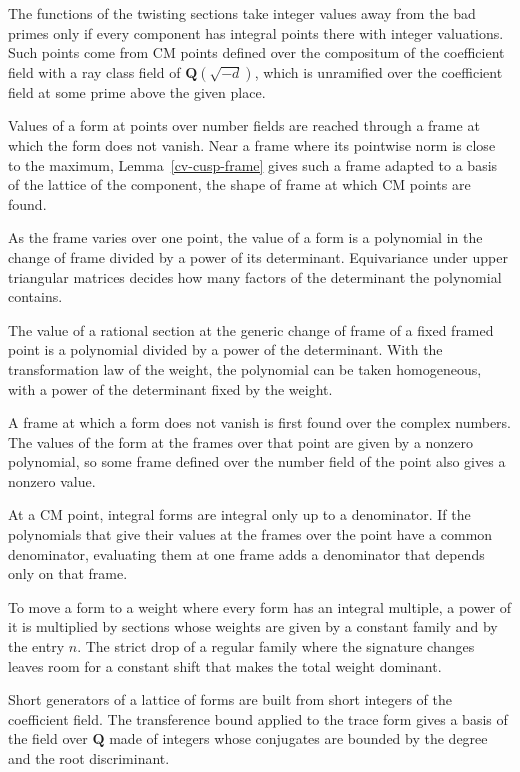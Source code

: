 The functions of the twisting sections take integer values away from the bad primes only if every
component has integral points there with integer valuations. Such points come from CM points defined over
the compositum of the coefficient field with a ray class field of $\mathbf Q(\sqrt{-d})$, which is
unramified over the coefficient field at some prime above the given place.

Values of a form at points over number fields are reached through a frame at which the form does not
vanish. Near a frame where its pointwise norm is close to the maximum, Lemma~\ref{cv-cusp-frame} gives such
a frame adapted to a basis of the lattice of the component, the shape of frame at which CM points are found.

As the frame varies over one point, the value of a form is a polynomial in the change of frame divided by a
power of its determinant. Equivariance under upper triangular matrices decides how many factors of the
determinant the polynomial contains.

The value of a rational section at the generic change of frame of a fixed framed point is a polynomial
divided by a power of the determinant. With the transformation law of the weight, the polynomial can be
taken homogeneous, with a power of the determinant fixed by the weight.

A frame at which a form does not vanish is first found over the complex numbers. The values of the form at
the frames over that point are given by a nonzero polynomial, so some frame defined over the number field
of the point also gives a nonzero value.

At a CM point, integral forms are integral only up to a denominator. If the polynomials that give their
values at the frames over the point have a common denominator, evaluating them at one frame adds a
denominator that depends only on that frame.

To move a form to a weight where every form has an integral multiple, a power of it is multiplied by
sections whose weights are given by a constant family and by the entry $n$. The strict drop of a regular
family where the signature changes leaves room for a constant shift that makes the total weight dominant.

Short generators of a lattice of forms are built from short integers of the coefficient field. The
transference bound applied to the trace form gives a basis of the field over $\mathbf Q$ made of integers
whose conjugates are bounded by the degree and the root discriminant.

